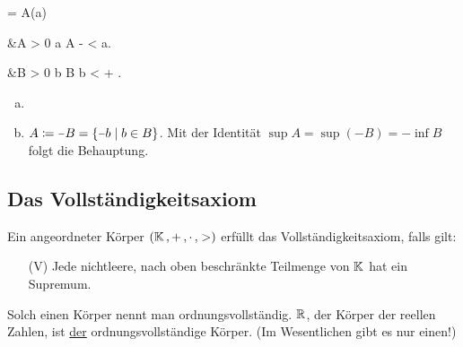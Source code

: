 \documentclass[../ana1.tex]{subfiles}
\begin{document}
\begin{lem}\label{satz:epskrit_inf_sup}\leavevmode
		\begin{alignenum}{\alpha = \sup A}{(a)}
			\begin{aitem}
				 &\iff \alpha \geq A \; \wedge \; \forall \varepsilon > 0 \; \exists a \in A \colon \; \alpha - \varepsilon < a.
			\end{aitem}\begin{aitem}
				 &\iff \beta  \leq B \; \wedge \; \forall \varepsilon > 0 \; \exists b \in B \colon \; b < \beta + \varepsilon.
			\end{aitem}
		\end{alignenum}
\end{lem}
\begin{bew}\leavevmode
	\begin{enumerate}[(a)]
		\item {}
		\item \(A \coloneqq \minus B = \set{\minus b \;\vert \;b \in B}\). Mit der Identität
			  \(\sup A = \sup(\minus B) = \minus \inf B\) folgt die Behauptung.\qedhere
	\end{enumerate}
\end{bew}


\subsection{Das Vollständigkeitsaxiom}

\begin{defi}
	Ein angeordneter Körper \((\mathbb{K} \operatorname{,} + \operatorname{,} \cdot \operatorname{,} >)\) erfüllt das Voll\-ständig\-keits\-axiom, falls gilt:
	\begin{enumerate}
		\item[(V)]\label{ax:V}Jede nichtleere, nach oben beschränkte Teilmenge von \(\mathbb{K}\) hat ein Supremum.
	\end{enumerate}
	Solch einen Körper nennt man ordnungsvollständig. \(\mathbb{R}\), der Körper der reellen Zahlen, ist \underline{der} ordnungsvollständige Körper. (Im Wesentlichen gibt es nur einen!)
\end{defi}
\end{document}
